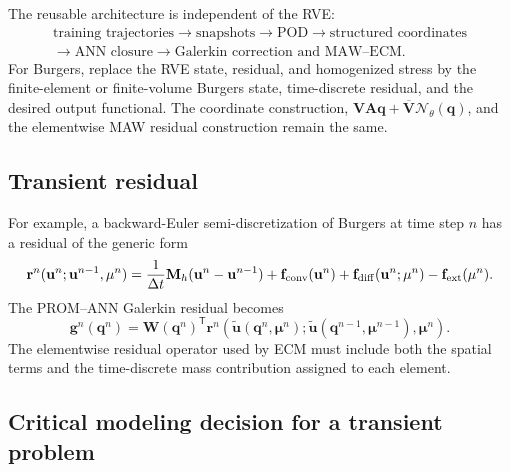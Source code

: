 \documentclass[11pt,a4paper]{article}
\newcommand{\transpose}{^{\mathsf T}}
\newcommand{\vect}[1]{\mathbf{#1}}
\newcommand{\mat}[1]{\mathbf{#1}}
\begin{document}
The reusable architecture is independent of the RVE:
\begin{equation}
  \begin{gathered}
    \text{training trajectories}
    \longrightarrow \text{snapshots}
    \longrightarrow \text{POD}
    \longrightarrow \text{structured coordinates}
    \\[0.3em]
    \longrightarrow \text{ANN closure}
    \longrightarrow \text{Galerkin correction and MAW--ECM}.
  \end{gathered}
  \label{eq:portable-chain}
\end{equation}
For Burgers, replace the RVE state, residual, and homogenized stress by the
finite-element or finite-volume Burgers state, time-discrete residual, and
the desired output functional.  The coordinate construction,
\(\mat V\mat A\vect q+\overline{\mat V}\mathcal N_\theta(\vect q)\), and
the elementwise MAW residual construction remain the same.

\subsection{Transient residual}

For example, a backward-Euler semi-discretization of Burgers at time step
\(n\) has a residual of the generic form
\begin{equation}
  \vect r^n(\vect u^n;\vect u^{n-1},\vect\mu^n)
  =\frac{1}{\Delta t}\mat M_h(\vect u^n-\vect u^{n-1})
   +\vect f_{\rm conv}(\vect u^n)
   +\vect f_{\rm diff}(\vect u^n;\vect\mu^n)
   -\vect f_{\rm ext}(\vect\mu^n).
  \label{eq:burgers-residual}
\end{equation}
The PROM--ANN Galerkin residual becomes
\begin{equation}
  \vect g^n(\vect q^n)
  =\mat W(\vect q^n)\transpose
    \vect r^n\!\left(
      \widetilde{\vect u}(\vect q^n,\vect\mu^n);
      \widetilde{\vect u}(\vect q^{n-1},\vect\mu^{n-1}),
      \vect\mu^n
    \right).
  \label{eq:burgers-prom}
\end{equation}
The elementwise residual operator used by ECM must include both the spatial
terms and the time-discrete mass contribution assigned to each element.

\subsection{Critical modeling decision for a transient problem}
\end{document}
